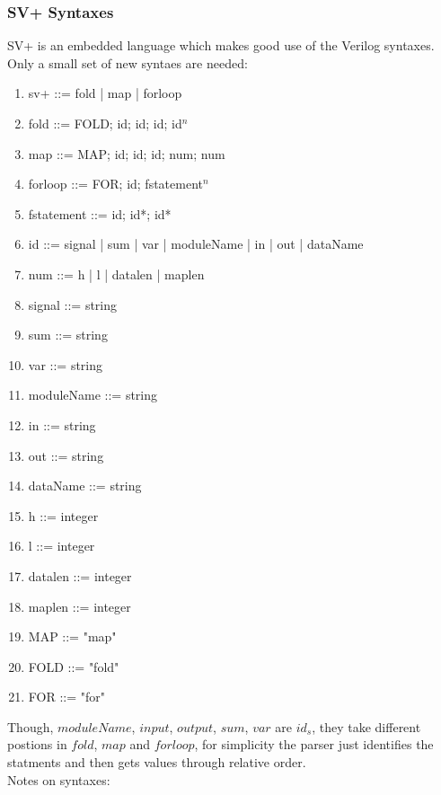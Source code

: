 \subsubsection{SV+ Syntaxes}
SV+ is an embedded language which makes good use of the Verilog syntaxes. Only a small set of new syntaes are needed:  
\itshape
\begin{enumerate}\itemsep2pt \parskip0pt 
  \item sv+ ::= fold | map | forloop
  \item fold ::= FOLD; id; id; id; id$^n$ 
  \item map ::= MAP; id; id; id; num; num
  \item forloop ::= FOR; id; fstatement$^n$
  \item fstatement ::= id; id*; id*
  \item id ::= signal | sum | var | moduleName | in
               | out | dataName
  \item num ::= h | l | datalen | maplen
  \item signal ::= string
  \item sum ::= string
  \item var ::= string
  \item moduleName ::= string
  \item in ::=  string
  \item out ::= string
  \item dataName ::= string
  \item h ::= integer
  \item l ::= integer
  \item datalen ::= integer
  \item maplen ::= integer
  \item MAP ::= "map"
  \item FOLD ::= "fold"
  \item FOR ::= "for"
\end{enumerate}
\normalfont
Though, $moduleName$, $input$, $output$, $sum$, $var$ are $id_s$, they take different postions in $fold$, $map$ and $forloop$, for simplicity the parser just identifies the statments and then gets values through relative order.\\
Notes on syntaxes:
